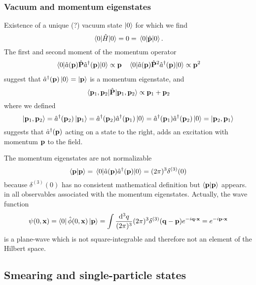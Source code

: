 \subsubsection{Vacuum and momentum eigenstates}
Existence of a unique (?) vacuum state $\ket{0}$ for which we find
\begin{equation}
	\expval{\hat{H}}{0}
	=
	0
	=
	\expval{\hat{\vb{p}}}{0}
	\label{eq:qkg_expval_energy_momentum_vacuum}.
\end{equation}
The first and second moment of the momentum operator
\begin{align}
	\expval{\hat{a}(\vb{p})\hat{\vb{P}}\hat{a}^\dagger(\vb{p})}{0}
	\propto
	\vb{p}
	&&
	\expval{\hat{a}(\vb{p})\hat{\vb{P}}^2\hat{a}^\dagger(\vb{p})}{0}
	\propto
	\vb{p}^2
\end{align}
suggest that $\hat{a}^\dagger(\vb{p})\ket{0}=\ket{\vb{p}}$ is a momentum eigenstate, and
\begin{equation}
	\expval{\hat{\vb{P}}}{\vb{p}_1,\vb{p}_2}
	\propto
	\vb{p}_1+\vb{p}_2
\end{equation}
where we defined
\begin{equation}
	\ket{\vb{p}_1,\vb{p}_2}
	=
	\hat{a}^\dagger(\vb{p}_2)\ket{\vb{p}_1}
	=
	\hat{a}^\dagger(\vb{p}_2)\hat{a}^\dagger(\vb{p}_1)\ket{0}
	=
	\hat{a}^\dagger(\vb{p}_1)\hat{a}^\dagger(\vb{p}_2)\ket{0}
	=
	\ket{\vb{p}_2,\vb{p}_1}
\end{equation}
suggests that $\hat{a}^\dagger(\vb{p})$ acting on a state to the right, adds an excitation with momentum $\vb{p}$ to the field.

The momentum eigenstates are not normalizable
\begin{equation}
	\bra{\vb{p}}\ket{\vb{p}}
	=
	\expval{\hat{a}(\vb{p})\hat{a}^\dagger(\vb{p})}{0}
	=
	(2\pi)^3\delta^{(3)}(0)
\end{equation}
because $\delta^{(3)}(0)$ has no consistent mathematical definition but $\bra{\vb{p}}\ket{\vb{p}}$ appears. in all observables associated with the momentum eigenstates.
Actually, the wave function
\begin{equation}
	\psi(0,\vb{x})
	=
	\bra{0}\hat\phi(0,\vb{x})\ket{\vb{p}}
	=
	\int\frac{\dd[3]{q}}{(2\pi)^3}
	(2\pi)^3\delta^{(3)}(\vb{q}-\vb{p})
	e^{-i\vb{q}\vdot\vb{x}}
	=
	e^{-i\vb{p}\vdot\vb{x}}
\end{equation}
is a plane-wave which is not square-integrable and therefore not an element of the Hilbert space.

\subsection{Smearing and single-particle states}

